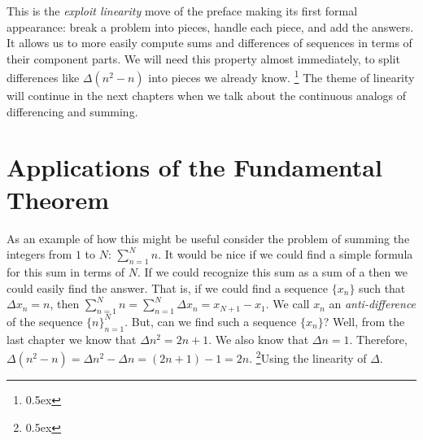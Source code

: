 This is the {\it exploit linearity\/} move of the preface making its first
formal appearance: break a problem into pieces, handle each piece, and add
the answers. It allows us to more easily compute sums and differences of
sequences in terms of their component parts. We will need this property almost
immediately, to split differences like $\Delta (n^2 - n)$ into pieces we
already know.%
\footnote{\kern 0.5pt \raise 0.5ex \hbox{\dag}}
{The theme of linearity will continue in the next chapters when we talk about the continuous analogs
of differencing and summing.}

\section{Applications of the Fundamental Theorem}
As an example of how this might be useful consider the problem of summing 
the integers from $1$ to $N$: $\sum_{n=1}^{N} n$. It would be nice if we could find a simple formula
for this sum in terms of $N$. If we could recognize this sum 
as a sum of a  then we could easily find the answer. That is,
if we could find a sequence $\{x_n\}$ such that $\Delta x_n = n$, then 
$\sum_{n=1}^N n = \sum_{n=1}^N \Delta x_n = x_{N+1} - x_1$. We call $x_n$ an {\it anti-difference\/} of the 
sequence $\{n\}_{n=1}^N$. But, can we find such a sequence $\{x_n\}$?
Well, from the last chapter we know that $\Delta n^2 = 2n+1$. We also know that $\Delta n = 1$.
Therefore,  $\Delta (n^2 - n) = \Delta n^2 - \Delta n = (2n + 1) - 1 = 2 n$.%
\footnote{\kern 0.5pt \raise 0.5ex \hbox{\ddag}}{Using the linearity of $\Delta$.}

